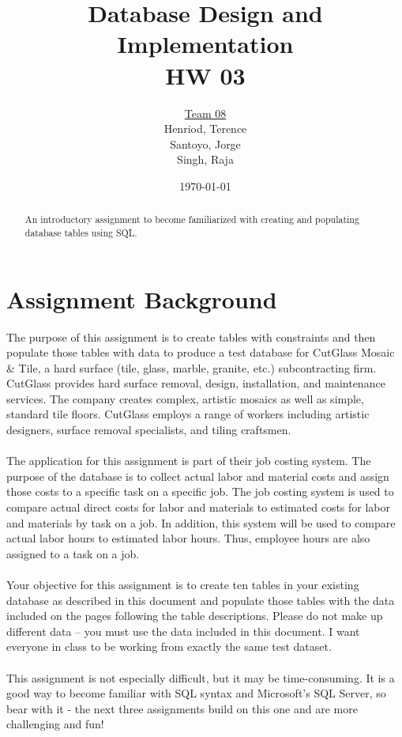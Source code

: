 \documentclass{article}
\title{Database Design and Implementation \\ HW 03}
\author{\underline{Team 08}\\Henriod, Terence\\Santoyo, Jorge \\Singh, Raja}
\date{\today}
\begin{document}
\clearpage
\maketitle
\thispagestyle{empty} %

\begin{abstract}
An introductory assignment to become familiarized with creating and populating database tables using SQL.
\end{abstract}

\newpage
\section{Assignment Background}
The purpose of this assignment is to create tables with constraints and then populate those tables with data to produce a test database for CutGlass Mosaic \& Tile, a hard surface (tile, glass, marble, granite, etc.) subcontracting firm. CutGlass provides hard surface removal, design, installation, and maintenance services.  The company creates complex, artistic mosaics as well as simple, standard tile floors.  CutGlass employs a range of workers including artistic designers, surface removal specialists, and tiling craftsmen.\\\\
The application for this assignment is part of their job costing system.  The purpose of the database is to collect actual labor and material costs and assign those costs to a specific task on a specific job.  The job costing system is used to compare actual direct costs for labor and materials to estimated costs for labor and materials by task on a job.  In addition, this system will be used to compare actual labor hours to estimated labor hours.  Thus, employee hours are also assigned to a task on a job.\\\\
Your objective for this assignment is to create ten tables in your existing database as described in this document and populate those tables with the data included on the pages following the table descriptions.  Please do not make up different data – you must use the data included in this document.  I want everyone in class to be working from exactly the same test dataset.\\\\
This assignment is not especially difficult, but it may be time-consuming. It is a good way to become familiar with SQL syntax and Microsoft’s SQL Server, so bear with it - the next three assignments build on this one and are more challenging and fun!\\
\end{document}
